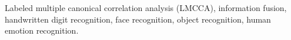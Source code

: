 \documentclass[journal]{IEEEtran}
\begin{document}
\begin{IEEEkeywords}
Labeled multiple canonical correlation analysis (LMCCA), information fusion, handwritten digit recognition, face recognition, object recognition, human emotion recognition.
\end{IEEEkeywords}

%
\IEEEpeerreviewmaketitle
\end{document}
